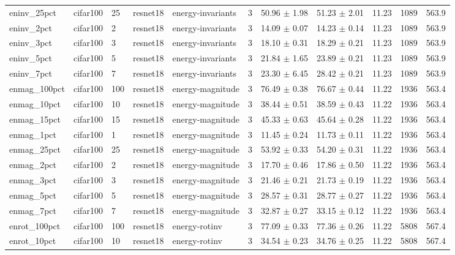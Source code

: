 \begin{tabular}{lllllllllll}
eninv_25pct & cifar100 & 25 & resnet18 & energy-invariants & 3 & 50.96 $\pm$ 1.98 & 51.23 $\pm$ 2.01 & 11.23 & 1089 & 563.9 \\
eninv_2pct & cifar100 & 2 & resnet18 & energy-invariants & 3 & 14.09 $\pm$ 0.07 & 14.23 $\pm$ 0.14 & 11.23 & 1089 & 563.9 \\
eninv_3pct & cifar100 & 3 & resnet18 & energy-invariants & 3 & 18.10 $\pm$ 0.31 & 18.29 $\pm$ 0.21 & 11.23 & 1089 & 563.9 \\
eninv_5pct & cifar100 & 5 & resnet18 & energy-invariants & 3 & 21.84 $\pm$ 1.65 & 23.89 $\pm$ 0.21 & 11.23 & 1089 & 563.9 \\
eninv_7pct & cifar100 & 7 & resnet18 & energy-invariants & 3 & 23.30 $\pm$ 6.45 & 28.42 $\pm$ 0.21 & 11.23 & 1089 & 563.9 \\
enmag_100pct & cifar100 & 100 & resnet18 & energy-magnitude & 3 & 76.49 $\pm$ 0.38 & 76.67 $\pm$ 0.44 & 11.22 & 1936 & 563.4 \\
enmag_10pct & cifar100 & 10 & resnet18 & energy-magnitude & 3 & 38.44 $\pm$ 0.51 & 38.59 $\pm$ 0.43 & 11.22 & 1936 & 563.4 \\
enmag_15pct & cifar100 & 15 & resnet18 & energy-magnitude & 3 & 45.33 $\pm$ 0.63 & 45.64 $\pm$ 0.28 & 11.22 & 1936 & 563.4 \\
enmag_1pct & cifar100 & 1 & resnet18 & energy-magnitude & 3 & 11.45 $\pm$ 0.24 & 11.73 $\pm$ 0.11 & 11.22 & 1936 & 563.4 \\
enmag_25pct & cifar100 & 25 & resnet18 & energy-magnitude & 3 & 53.92 $\pm$ 0.33 & 54.20 $\pm$ 0.31 & 11.22 & 1936 & 563.4 \\
enmag_2pct & cifar100 & 2 & resnet18 & energy-magnitude & 3 & 17.70 $\pm$ 0.46 & 17.86 $\pm$ 0.50 & 11.22 & 1936 & 563.4 \\
enmag_3pct & cifar100 & 3 & resnet18 & energy-magnitude & 3 & 21.46 $\pm$ 0.21 & 21.73 $\pm$ 0.19 & 11.22 & 1936 & 563.4 \\
enmag_5pct & cifar100 & 5 & resnet18 & energy-magnitude & 3 & 28.57 $\pm$ 0.31 & 28.77 $\pm$ 0.27 & 11.22 & 1936 & 563.4 \\
enmag_7pct & cifar100 & 7 & resnet18 & energy-magnitude & 3 & 32.87 $\pm$ 0.27 & 33.15 $\pm$ 0.12 & 11.22 & 1936 & 563.4 \\
enrot_100pct & cifar100 & 100 & resnet18 & energy-rotinv & 3 & 77.09 $\pm$ 0.33 & 77.36 $\pm$ 0.26 & 11.22 & 5808 & 567.4 \\
enrot_10pct & cifar100 & 10 & resnet18 & energy-rotinv & 3 & 34.54 $\pm$ 0.23 & 34.76 $\pm$ 0.25 & 11.22 & 5808 & 567.4 \\

\end{tabular}
